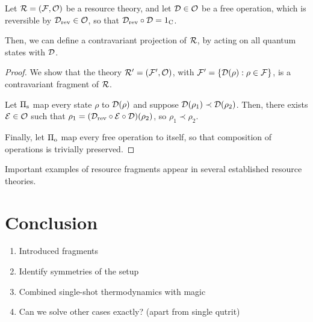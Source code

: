 \documentclass[pra,
aps,
twocolumn,
superscriptaddress,
groupedaddress,
nofootinbib,
reprint
]{revtex4-1}
\begin{document}
\begin{proposition}
	Let $\mathcal{R} = (\mathcal{F},\mathcal{O})$ be a resource theory, and let $\mathcal{D} \in \mathcal{O}$ be a free operation, which is reversible by $\mathcal{D}_{\rm{rev}} \in \mathcal{O}$, so that $\mathcal{D}_{\rm{rev}} \circ \mathcal{D} = 1_{\rm{C}}$.
	
	Then, we can define a contravariant projection of $\mathcal{R}$, by acting on all quantum states with $\mathcal{D}$.
\end{proposition}
\begin{proof}
	We show that the theory $\mathcal{R}' = (\mathcal{F}', \mathcal{O})$, with $\mathcal{F}' = \{\mathcal{D}(\rho):\rho \in \mathcal{F} \}$, is a contravariant fragment of $\mathcal{R}$.
	
	Let $\Pi_{\rm{s}}$ map every state $\rho$ to $\mathcal{D}(\rho)$ and suppose $\mathcal{D}(\rho_1) \prec \mathcal{D}(\rho_2)$. 
	Then, there exists $\mathcal{E} \in \mathcal{O}$ such that $\rho_1 = (\mathcal{D}_{\rm{rev}} \circ \mathcal{E} \circ \mathcal{D}) (\rho_2)$, so $\rho_1 \prec \rho_2$.
	
	Finally, let $\Pi_{\rm{o}}$ map every free operation to itself, so that composition of operations is trivially preserved.
	
 
\end{proof}

Important examples of resource fragments appear in several established resource theories.  

\newpage


\section{Conclusion}
\label{sec:conc}

\begin{enumerate}
    \item Introduced fragments
    \item Identify symmetries of the setup
    \item Combined single-shot thermodynamics with magic 
    \item Can we solve other cases exactly? (apart from single qutrit)
\end{enumerate}



%


\appendix

\end{document}
